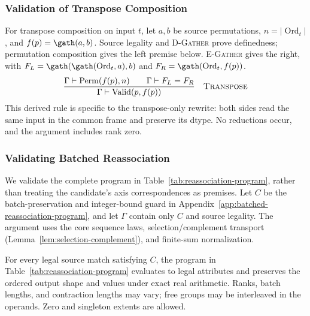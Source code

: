\subsubsection{Validation of Transpose Composition}
\label{app:transpose-validation}
For transpose composition on input $t$, let $a,b$ be source permutations,
$n=|\operatorname{Ord}_t|$, and $f(p)=\gath(a,b)$. Source legality and
\textsc{D-Gather} prove definedness; permutation composition gives the left
premise below. \textsc{E-Gather} gives the right, with
$F_L=\gath(\gath(\operatorname{Ord}_t,a),b)$ and
$F_R=\gath(\operatorname{Ord}_t,f(p))$.
\begin{equation}
 \frac{\Gamma\vdash\operatorname{Perm}(f(p),n)
       \qquad\Gamma\vdash F_L=F_R}
      {\Gamma\vdash\operatorname{Valid}(p,f(p))}
 \quad\text{\textsc{Transpose}}
 \label{eq:transpose-validation-tree}
\end{equation}
This derived rule is specific to the transpose-only rewrite: both sides
read the same input in the common frame and preserve its dtype. No
reductions occur, and the argument includes rank zero.

\subsubsection{Validating Batched Reassociation}
\label{app:reassociation-validation}
We validate the complete program in
Table~\ref{tab:reassociation-program}, rather than treating the candidate's
axis correspondences as premises. Let $C$ be the batch-preservation and
integer-bound guard in Appendix~\ref{app:batched-reassociation-program}, and let
$\Gamma$ contain only $C$ and source legality. The argument uses the core
sequence laws, selection/complement transport
(Lemma~\ref{lem:selection-complement}), and finite-sum normalization.

\begin{proposition}
\label{prop:reassociation-program}
For every legal source match satisfying $C$, the program in
Table~\ref{tab:reassociation-program} evaluates to legal attributes and
preserves the ordered output shape and values under exact real arithmetic.
Ranks, batch lengths, and contraction lengths may vary; free groups may
be interleaved in the operands. Zero and singleton extents are allowed.
\end{proposition}
